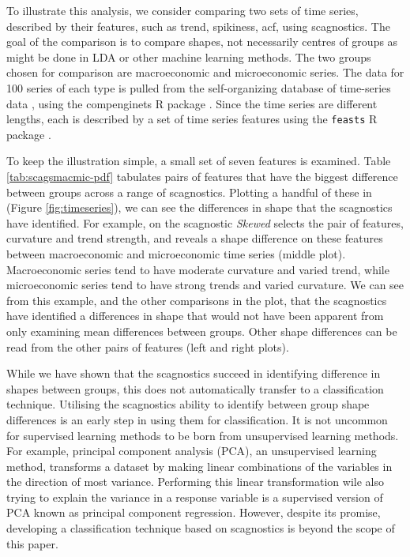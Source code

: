 To illustrate this analysis, we consider comparing two sets of time
series, described by their features, such as trend, spikiness, acf,
using scagnostics. The goal of the comparison is to compare shapes, not
necessarily centres of groups as might be done in LDA or other machine
learning methods. The two groups chosen for comparison are macroeconomic
and microeconomic series. The data for 100 series of each type is pulled
from the self-organizing database of time-series data \citep{sots},
using the compenginets R package \citep{compenginets}. Since the time
series are different lengths, each is described by a set of time series
features \citep[chapter 4 of][]{fpp} using the \texttt{feasts} R package
\citep{feasts}.

To keep the illustration simple, a small set of seven features is
examined. Table \ref{tab:scagsmacmic-pdf} tabulates pairs of features
that have the biggest difference between groups across a range of
scagnostics. Plotting a handful of these in (Figure
\ref{fig:timeseries}), we can see the differences in shape that the
scagnostics have identified. For example, on the scagnostic
\emph{Skewed} selects the pair of features, curvature and trend
strength, and reveals a shape difference on these features between
macroeconomic and microeconomic time series (middle plot). Macroeconomic
series tend to have moderate curvature and varied trend, while
microeconomic series tend to have strong trends and varied curvature. We
can see from this example, and the other comparisons in the plot, that
the scagnostics have identified a differences in shape that would not
have been apparent from only examining mean differences between groups.
Other shape differences can be read from the other pairs of features
(left and right plots).

While we have shown that the scagnostics succeed in identifying
difference in shapes between groups, this does not automatically
transfer to a classification technique. Utilising the scagnostics
ability to identify between group shape differences is an early step in
using them for classification. It is not uncommon for supervised
learning methods to be born from unsupervised learning methods. For
example, principal component analysis (PCA), an unsupervised learning
method, transforms a dataset by making linear combinations of the
variables in the direction of most variance. Performing this linear
transformation wile also trying to explain the variance in a response
variable is a supervised version of PCA known as principal component
regression. However, despite its promise, developing a classification
technique based on scagnostics is beyond the scope of this paper.

